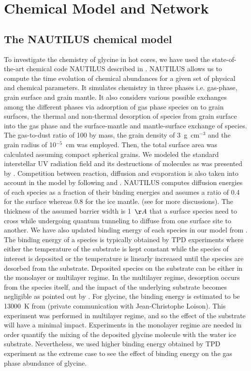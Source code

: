 \documentclass{aastex61}
\begin{document}
\section{Chemical Model and Network }



\subsection{The NAUTILUS chemical model}

To investigate the chemistry of glycine in hot cores, we have used the state-of-the-art chemical code NAUTILUS described
in \cite{Ruaud16}. NAUTILUS allows us to compute the time evolution of chemical abundances for a given set of physical 
and chemical parameters. It simulates chemistry in three phases i.e. gas-phase, grain surface and grain mantle. It also considers various 
possible exchanges among the different phases via adsorption of gas phase species on to grain surfaces, the thermal and non-thermal desorption of species 
from grain surface into the gas phase and the surface-mantle and mantle-surface exchange of species. 
The gas-to-dust ratio of 100 by mass, the grain density of 3~g~cm$^{-3}$ and the grain radius of 10$^{-5}$~cm was employed.
%
Then, the total surface area was calculated assuming compact spherical grains.
%
We modeled the standard interstellar UV radiation field and its destructions of molecules as was presented by \cite{Ruaud16}.
%
Competition between reaction, diffusion and evaporation is also taken 
into account in the model by following \cite{Chang07} and \cite{Garrod07}. NAUTILUS computes diffusion energies of each species as a fraction of their binding energies and assumes a ratio of 0.4 for the surface whereas 0.8 for the ice mantle. 
(see \cite{Ruaud16} for more discussions).  
%
The thickness of the assumed barrier width is 1~$\AA$ that a surface species need to cross while undergoing quantum tunneling to diffuse from one surface site to another.
%
We have also updated binding energy of each species in our model from \cite{Wakelam17}.
%
The binding energy of a species is typically obtained by TPD experiments where either the temperature of the substrate is kept constant while the species of interest is deposited or the temperature is linearly increased until the species are desorbed from the substrate. Deposited species on the substrate can be either in the monolayer or multilayer regime.  In the multilayer regime, desorption occurs from the species itself, and the impact of the underlying substrate becomes negligible as pointed out by \cite{Green09}.
%
For glycine, the binding energy is estimated to be 13000~K from \cite{Tzvetkov04} (private communication with Jean-Christophe Loison).
%
This experiment was performed in multilayer regime, and so the effect of the substrate will have a minimal impact. Experiments in the monolayer regime are needed in order quantify the mixing of the deposited glycine molecule with the water ice substrate. 
%
Nevertheless, we used higher binding energy obtained by TPD experiment as the extreme case to see the effect of binding energy on the gas phase abundance of glycine.
\end{document}
